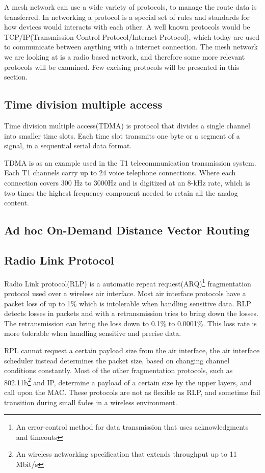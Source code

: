 A mesh network can use a wide variety of protocols, to manage the route data is transferred.
In networking a protocol is a special set of rules and standards for how devices would interacts with each other.
A well known protocols would be TCP/IP(Transmission Control Protocol/Internet Protocol), which today are used to communicate between anything with a internet connection.
The mesh network we are looking at is a radio based network, and therefore some more relevant protocols will be examined. 
Few excising protocols will be presented in this section.

\subsection{Time division multiple access}
Time division multiple access(TDMA) is protocol that divides a single channel into smaller time slots. Each time slot transmits one byte or a segment of a signal, in a sequential serial data format.

TDMA is as an example used in the T1 telecommunication transmission system.
Each T1 channels carry up to 24 voice telephone connections.
Where each connection covers 300 Hz to 3000Hz and is digitized at an 8-kHz rate, which is two times the highest frequency component needed to retain all the analog content.

\subsection{Ad hoc On-Demand Distance Vector Routing}


\subsection{Radio Link Protocol}
Radio Link protocol(RLP) is a automatic repeat request(ARQ)\footnote{An error-control method for data transmission that uses acknowledgments and timeouts} fragmentation protocol used over a wireless air interface.
Most air interface protocols have a packet loss of up to 1\% which is intolerable when handling sensitive data.
RLP detects losses in packets and with a retransmission tries to bring down the losses.
The retransmission can bring the loss down to 0.1\% to 0.0001\%.
This loss rate is more tolerable when handling sensitive and precise data.

RPL cannot request a certain payload size from the air interface, the air interface scheduler instead determines the packet size, based on changing channel conditions constantly.
Most of the other fragmentation protocols, such as 802.11b\footnote{An wireless networking specification that extends throughput up to 11 Mbit/s} and IP, determine a payload of a certain size by the upper layers, and call upon the MAC.
These protocols are not as flexible as RLP, and sometime fail transition during small fades in a wireless environment. 